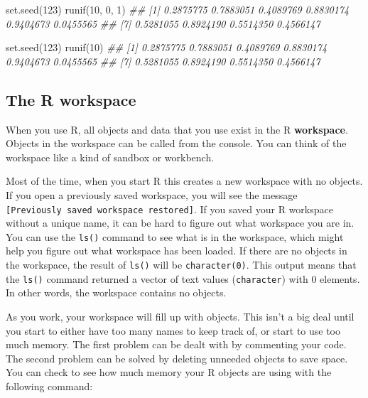 \documentclass[
  13,
  letterpaper,
]{report}
\newenvironment{Shaded}{\begin{snugshade}}{\end{snugshade}}
\newcommand{\DecValTok}[1]{\textcolor[rgb]{0.68,0.00,0.00}{#1}}
\newcommand{\DocumentationTok}[1]{\textcolor[rgb]{0.37,0.37,0.37}{\textit{#1}}}
\newcommand{\FunctionTok}[1]{\textcolor[rgb]{0.28,0.35,0.67}{#1}}
\newcommand{\NormalTok}[1]{\textcolor[rgb]{0.00,0.23,0.31}{#1}}
\begin{document}
\begin{Shaded}
\begin{Highlighting}[]
\FunctionTok{set.seed}\NormalTok{(}\DecValTok{123}\NormalTok{)}
\FunctionTok{runif}\NormalTok{(}\DecValTok{10}\NormalTok{, }\DecValTok{0}\NormalTok{, }\DecValTok{1}\NormalTok{)}
\DocumentationTok{\#\#  [1] 0.2875775 0.7883051 0.4089769 0.8830174 0.9404673 0.0455565}
\DocumentationTok{\#\#  [7] 0.5281055 0.8924190 0.5514350 0.4566147}

\FunctionTok{set.seed}\NormalTok{(}\DecValTok{123}\NormalTok{)}
\FunctionTok{runif}\NormalTok{(}\DecValTok{10}\NormalTok{)}
\DocumentationTok{\#\#  [1] 0.2875775 0.7883051 0.4089769 0.8830174 0.9404673 0.0455565}
\DocumentationTok{\#\#  [7] 0.5281055 0.8924190 0.5514350 0.4566147}
\end{Highlighting}
\end{Shaded}

\subsection{The R workspace}\label{sec-r-comm-workspace}

When you use R, all objects and data that you use exist in the R
\textbf{workspace}. Objects in the workspace can be called from the
console. You can think of the workspace like a kind of sandbox or
workbench.

Most of the time, when you start R this creates a new workspace with no
objects. If you open a previously saved workspace, you will see the
message \texttt{{[}Previously\ saved\ workspace\ restored{]}}. If you
saved your R workspace without a unique name, it can be hard to figure
out what workspace you are in. You can use the \texttt{ls()} command to
see what is in the workspace, which might help you figure out what
workspace has been loaded. If there are no objects in the workspace, the
result of \texttt{ls()} will be \texttt{character(0)}. This output means
that the \texttt{ls()} command returned a vector of text values
(\texttt{character}) with 0 elements. In other words, the workspace
contains no objects.

As you work, your workspace will fill up with objects. This isn't a big
deal until you start to either have too many names to keep track of, or
start to use too much memory. The first problem can be dealt with by
commenting your code. The second problem can be solved by deleting
unneeded objects to save space. You can check to see how much memory
your R objects are using with the following command:
\end{document}
